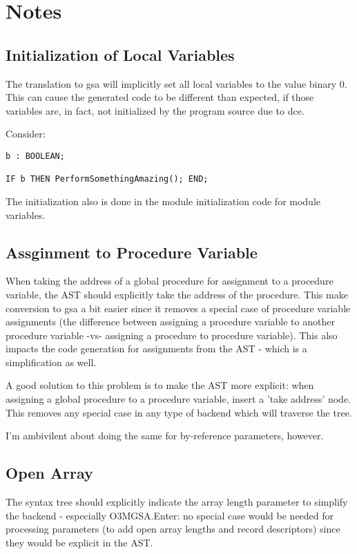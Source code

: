 \chapter{Notes}

\section{Initialization of Local Variables}
The translation to gsa will implicitly set all local variables to the
value binary 0.  This can cause the generated code to be different
than expected, if those variables are, in fact, not initialized by the
program source due to dce.

Consider:

\begin{verbatim}
b : BOOLEAN;

IF b THEN PerformSomethingAmazing(); END;
\end{verbatim}

The initialization also is done in the module initialization code for
module variables.

\section{Assginment to Procedure Variable}
When taking the address of a global procedure for assignment to a
procedure variable, the AST should explicitly take the address of the
procedure.  This make conversion to gsa a bit easier since it removes
a special case of procedure variable assignments (the difference
between assigning a procedure variable to another procedure variable
-vs- assigning a procedure to procedure variable).  This also impacts
the code generation for assignments from the AST - which is a
simplification as well.

A good solution to this problem is to make the AST more explicit: when
assigning a global procedure to a procedure variable, insert a 'take
address' node.  This removes any special case in any type of backend
which will traverse the tree.

I'm ambivilent about doing the same for by-reference parameters, however.

\section{Open Array}
The syntax tree should explicitly indicate the array length parameter
to simplify the backend - especially O3MGSA.Enter: no special case
would be needed for processing parameters (to add open array lengths
and record descriptors) since they would be explicit in the AST.

